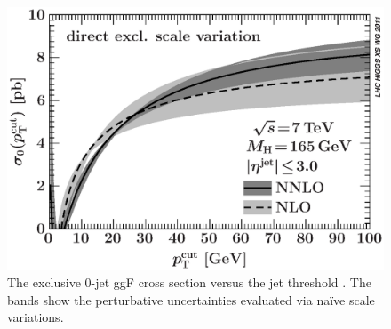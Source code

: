 \begin{figure}[t]
	\includegraphics[width=\mediumfigwidth]{tex/signal/sigma0_naive}
	\caption{The exclusive 0-jet ggF cross section versus the jet \pt threshold \cite{YR2}. 
	The bands show the perturbative uncertainties evaluated via na\"{i}ve scale variations.}
	\label{fig:ggF:naive}
\end{figure}

